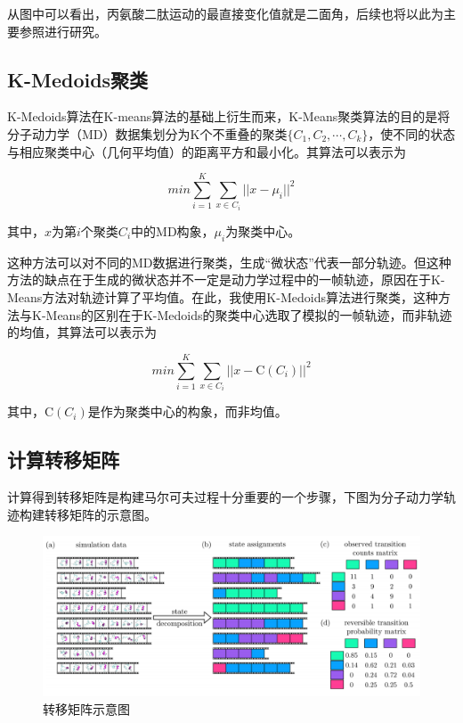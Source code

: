\documentclass[a4paper]{article}
\begin{document}
\begin{CJK}{UTF8}{gbsn}
	从图中可以看出，丙氨酸二肽运动的最直接变化值就是二面角，后续也将以此为主要参照进行研究。


	
	\subsection{K-Medoids聚类}

K-Medoids算法在K-means算法的基础上衍生而来，K-Means聚类算法的目的是将分子动力学（MD）数据集划分为K个不重叠的聚类$\{C_{1},C_{2}, \cdots,  C_{k}\}$，使不同的状态与相应聚类中心（几何平均值）的距离平方和最小化。其算法可以表示为

\begin{equation}
min\sum_{i=1}^{K}\sum_{x\in C_{i}}^{} {\vert\vert x- \mu_{i} \vert\vert}^{2}
\end{equation}

其中，$x$为第$i$个聚类$C_{i}$中的MD构象，$\mu_{i}$为聚类中心。


这种方法可以对不同的MD数据进行聚类，生成“微状态”代表一部分轨迹。但这种方法的缺点在于生成的微状态并不一定是动力学过程中的一帧轨迹，原因在于K-Means方法对轨迹计算了平均值。在此，我使用K-Medoids算法进行聚类，这种方法与K-Means的区别在于K-Medoids的聚类中心选取了模拟的一帧轨迹，而非轨迹的均值，其算法可以表示为

\begin{equation}
min\sum_{i=1}^{K}\sum_{x\in C_{i}}^{} {\vert\vert x- \mathrm C(C_{i}) \vert\vert}^{2}
\end{equation}


其中，$\mathrm C(C_{i})$是作为聚类中心的构象，而非均值。


	\subsection{计算转移矩阵}
计算得到转移矩阵是构建马尔可夫过程十分重要的一个步骤，下图为分子动力学轨迹构建转移矩阵的示意图。

\begin{figure}[H]
\centering
\includegraphics[scale=0.48]{trans_matrix.png}
\caption{转移矩阵示意图}
\end{figure}




\end{CJK}
\end{document}
